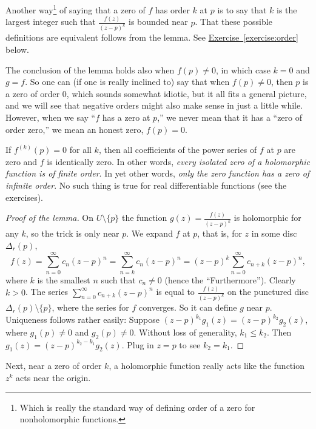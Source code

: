 \documentclass[12pt,openany]{book}
\newcommand{\myquote}[1]{``#1''}
\theoremstyle{plain}
\theoremstyle{remark}
\theoremstyle{definition}
\theoremstyle{exercise}
\theoremstyle{example}
\newcommand{\exerciseref}[1]{\hyperref[#1]{Exercise~\ref*{#1}}}
\begin{document}
Another way\footnote{Which is really the standard way of defining order of a
zero for nonholomorphic functions.}
of saying that a zero of $f$ has order $k$ at $p$ is to say that
$k$ is the largest integer such that $\frac{f(z)}{{(z-p)}^{k}}$ is bounded
near $p$.  That these possible definitions are equivalent
follows from the lemma.  See \exerciseref{exercise:order} below.

The conclusion of the lemma holds also when $f(p) \not= 0$,
in which case
$k=0$ and $g = f$.  So one can (if one is really inclined to)
say that when $f(p) \not= 0$, then $p$ is
a zero of order $0$, which sounds somewhat idiotic, but it all fits a general
picture, and we will see that negative orders might also make sense
in just a little while.
However, when we say \myquote{$f$ has a zero at $p$,}
we never mean that it has a
\myquote{zero of order zero,} we mean an honest zero, $f(p) = 0$.

If $f^{(k)}(p) = 0$
for all $k$, then all coefficients of the power series of $f$ at $p$ are
zero and $f$ is identically zero.  In other words, \emph{every isolated
zero of a holomorphic function is of finite order}.
In yet other words, \emph{only the zero function has a zero of infinite order}.
No such thing is true for real differentiable functions (see the exercises).

\begin{proof}[Proof of the lemma]
On $U \setminus \{ p \}$ the function $g(z) = \frac{f(z)}{{(z-p)}^k}$ is
holomorphic for any $k$, so the trick is only near $p$.  We expand $f$ at
$p$,
that is, for $z$ in some disc $\Delta_r(p)$,
\begin{equation*}
f(z) =
\sum_{n=0}^\infty c_n {(z-p)}^n =
\sum_{n=k}^\infty c_n {(z-p)}^n 
= {(z-p)}^k
\sum_{n=0}^\infty c_{n+k} {(z-p)}^{n} ,
\end{equation*}
where $k$ is the smallest $n$ such that $c_n \not= 0$
(hence the \myquote{Furthermore}).
Clearly $k > 0$.
The series $\sum_{n=0}^\infty c_{n+k}{(z-p)}^n$
is equal to $\frac{f(z)}{{(z-p)}^k}$ on
the punctured disc $\Delta_r(p)\setminus \{ p \}$, where the series
for $f$ converges.
So it can define $g$ near $p$.  Uniqueness follows rather easily:
Suppose ${(z-p)}^{k_1} g_1(z) = {(z-p)}^{k_2} g_2(z)$, where
$g_1(p) \not= 0$ and $g_2(p) \not= 0$.
Without loss of generality,
$k_1 \leq k_2$.
Then 
$g_1(z) = {(z-p)}^{k_2-k_1} g_2(z)$.  Plug in $z=p$ to see $k_2 =
k_1$.
\end{proof}

Next, near a zero of order $k$, a holomorphic function really acts like the
function $z^k$ acts near the origin.
\end{document}
